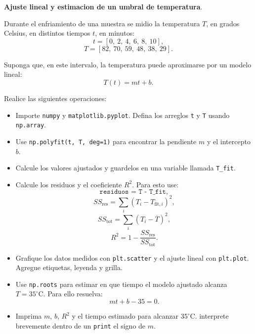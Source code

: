 \item \textbf{Ajuste lineal y estimacion de un umbral de temperatura}.
\nopagebreak[4]

\begin{tcolorbox}[colback=blue!2!white,colframe=blue!55!black,title={Enunciado},
                  before skip=3pt,after skip=5pt,boxsep=3pt,top=3pt,bottom=3pt,
                  breakable]
\small
\raggedright
Durante el enfriamiento de una muestra se midio la temperatura \(T\), en grados
Celsius, en distintos tiempos \(t\), en minutos:
\[
t = [0,\ 2,\ 4,\ 6,\ 8,\ 10],
\]
\[
T = [82,\ 70,\ 59,\ 48,\ 38,\ 29].
\]

Suponga que, en este intervalo, la temperatura puede aproximarse por un modelo
lineal:
\[
T(t) = mt + b.
\]

Realice las siguientes operaciones:

\begin{itemize}
\setlength{\topsep}{4pt}
\setlength{\itemsep}{3pt}
\setlength{\parsep}{0pt}
\item[(a)] Importe \texttt{numpy} y \texttt{matplotlib.pyplot}. Defina los arreglos \texttt{t} y \texttt{T} usando \texttt{np.array}.
\item[(b)] Use \texttt{np.polyfit(t, T, deg=1)} para encontrar la pendiente \(m\) y el intercepto \(b\).
\item[(c)] Calcule los valores ajustados y guardelos en una variable llamada \texttt{T\_fit}.
\item[(d)] Calcule los residuos y el coeficiente \(R^2\). Para esto use:
\[
\texttt{residuos = T - T\_fit},
\]
\[
SS_{\mathrm{res}} = \sum_i \left(T_i - T_{\mathrm{fit},i}\right)^2,
\]
\[
SS_{\mathrm{tot}} = \sum_i \left(T_i - \overline{T}\right)^2,
\]
\[
R^2 = 1 - \frac{SS_{\mathrm{res}}}{SS_{\mathrm{tot}}}.
\]
\item[(e)] Grafique los datos medidos con \texttt{plt.scatter} y el ajuste lineal con \texttt{plt.plot}. Agregue etiquetas, leyenda y grilla.
\item[(f)] Use \texttt{np.roots} para estimar en que tiempo el modelo ajustado alcanza \(T=35^\circ\mathrm{C}\). Para ello resuelva:
\[
mt + b - 35 = 0.
\]
\item[(g)] Imprima \(m\), \(b\), \(R^2\) y el tiempo estimado para alcanzar \(35^\circ\mathrm{C}\). interprete brevemente dentro de un \texttt{print} el signo de \(m\).
\end{itemize}
\end{tcolorbox}

